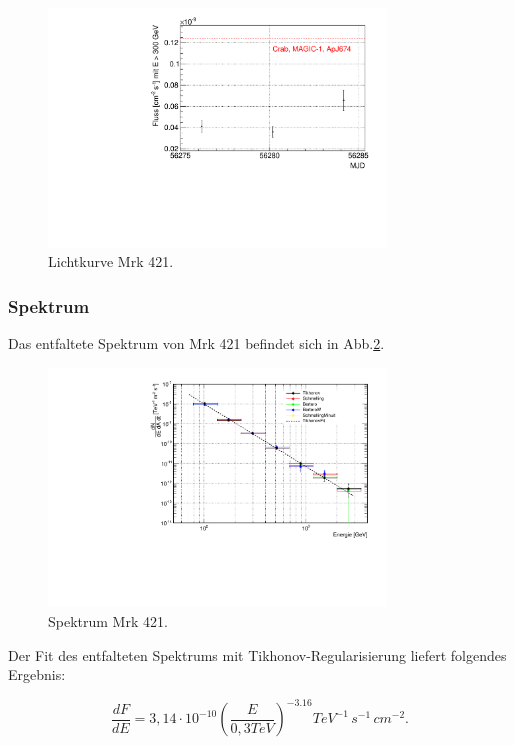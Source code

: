 \begin{figure}
    \centering
    \includegraphics[width=0.8\textwidth]{./Plots/04_MrkAnalyse/Datenset4/Datenset4_LC_Mrk421.pdf}
    \caption{Lichtkurve Mrk 421.}
    \label{Datenset4_LC_Mrk421}
\end{figure}


\subsubsection{Spektrum}
Das entfaltete Spektrum von Mrk 421 befindet sich in Abb.\ref{Datenset4_Spektrum_Mrk421}.

\begin{figure}
    \centering
    \includegraphics[width=0.8\textwidth]{./Plots/04_MrkAnalyse/Datenset4/Datenset4_Spektrum_Mrk421.pdf}
    \caption{Spektrum Mrk 421.}
    \label{Datenset4_Spektrum_Mrk421}
\end{figure}

Der Fit des entfalteten Spektrums mit Tikhonov-Regularisierung liefert folgendes Ergebnis:

\begin{equation}
 \frac{dF}{dE}=3,14 \cdot 10^{-10}\left( \frac{E}{0,3 \si{TeV}} \right)^{-3.16} \si{TeV^{-1}\,s^{-1}\,cm^{-2}}.
\end{equation}


